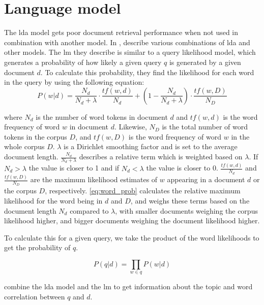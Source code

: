 \section{Language model}\label{sec:lm}
The \gls{lda} model gets poor document retrieval performance when not used in combination with another model\cite{yang2009topic}.
In \cite{yang2009topic}, \citeauthor{yang2009topic} describe various combinations of \gls{lda} and other models. 
The \acrlong{lm} they describe is similar to a query likelihood model, which generates a probability of how likely a given query $q$ is generated by a given document $d$.
To calculate this probability, they find the likelihood for each word in the query by using the following equation:
\begin{equation}\label{eq:word_prob}
	P(w|d) = \frac{N_d}{N_d + \lambda} \cdot \frac{tf(w,d)}{N_d} + (1 - \frac{N_d}{N_d + \lambda}) \cdot \frac{tf(w,D)}{N_D}
\end{equation}

where $N_d$ is the number of word tokens in document $d$ and $tf(w,d)$ is the word frequency of word $w$ in document $d$. Likewise, $N_D$ is the total number of word tokens in the corpus $D$, and $tf(w,D)$ is the word frequency of word $w$ in the whole corpus $D$. $\lambda$ is a Dirichlet smoothing factor and is set to the average document length.
$ \frac{N_d}{N_d + \lambda} $ describes a relative term which is weighted based on $ \lambda $. If $N_d > \lambda$ the value is closer to 1 and if $ N_d < \lambda $ the value is closer to 0.
$ \frac{tf(w,d)}{N_d} $ and $\frac{tf(w,D)}{N_D}$ are the maximum likelihood estimates of $w$ appearing in a document $d$ or the corpus $D$, respectively.
\autoref{eq:word_prob} calculates the relative maximum likelihood for the word being in $ d $ and $ D $, and weighs these terms based on the document length $N_d$ compared to $\lambda$, with smaller documents weighing the corpus likelihood higher, and bigger documents weighing the document likelihood higher.

To calculate this for a given query, we take the product of the word likelihoods to get the probability of $q$.

\begin{equation}\label{eq:query_prob}
	P(q|d) = \prod_{w \in q} P(w|d)
\end{equation}

\cite{yang2009topic} combine the \gls{lda} model and the \gls{lm} to get information about the topic and word correlation between $q$ and $d$.
